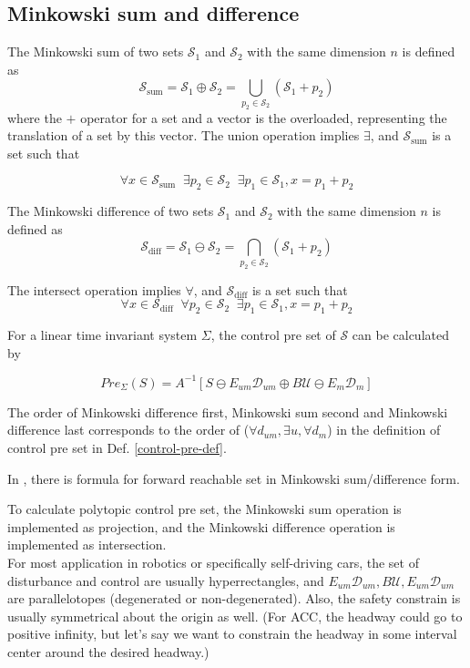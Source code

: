 \documentclass{article}
\begin{document}
\subsection{Minkowski sum and difference}
The Minkowski sum of two sets $\mathcal{S}_1$ and $\mathcal{S}_2$ with the same dimension $n$ is defined as 
$$
\mathcal{S}_{\text{sum}} = \mathcal{S}_1 \oplus \mathcal{S}_2 = \bigcup_{p_2 \in \mathcal{S}_2} (\mathcal{S}_1 + p_2)
$$
where the $+$ operator for a set and a vector is the overloaded, representing the translation of a set by this vector. The union operation implies $\exists$, and $\mathcal{S}_{\text{sum}}$ is a set such that

$$
\forall x \in \mathcal S_{\text{sum}} \;\;\exists p_2 \in \mathcal{S}_2  \;\;\exists p_1 \in \mathcal{S}_1, x =  p_1 + p_2
$$

The Minkowski difference of two sets $\mathcal{S}_1$ and $\mathcal{S}_2$ with the same dimension $n$ is defined as 
$$
\mathcal{S}_{\text{diff}} = \mathcal{S}_1 \ominus \mathcal{S}_2 = \bigcap_{p_2 \in \mathcal{S}_2} (\mathcal{S}_1 + p_2)
$$

The intersect operation implies $\forall$, and $\mathcal{S}_{\text{diff}}$ is a set such that
$$
\forall x \in \mathcal S_{\text{diff}}  \;\;\forall p_2 \in \mathcal{S}_2 \;\;\exists p_1 \in \mathcal{S}_1, x = p_1 + p_2 
$$

For a linear time invariant system $\Sigma$, the control pre set of $\mathcal{S}$ can be calculated by 

\begin{equation}
Pre_{\Sigma}(S) = A^{-1}\left[S \ominus E_{um} \mathcal D_{um} \oplus B \mathcal U \ominus E_{m} \mathcal D_{m}\right]
\label{control-pre}
\end{equation}

The order of Minkowski difference first, Minkowski sum second and Minkowski difference last corresponds to the order of ($\forall d_{um}, \exists u, \forall d_{m}$) in the definition of control pre set in Def. \ref{control-pre-def}.

In \cite{ellipsoid-toolbox}, there is formula for forward reachable set in Minkowski sum/difference form.

To calculate polytopic control pre set, the Minkowski sum operation is implemented as projection, and the Minkowski difference operation is implemented as intersection.\\

For most application in robotics or specifically self-driving cars, the set of disturbance and control are usually hyperrectangles, and $E_{um} \mathcal D_{um}, B \mathcal U, E_{um} \mathcal D_{um}$ are parallelotopes (degenerated or non-degenerated). Also, the safety constrain is usually symmetrical about the origin as well. (For ACC, the headway could go to positive infinity, but let's say we want to constrain the headway in some interval center around the desired headway.)
\end{document}

